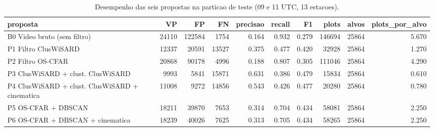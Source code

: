 \begin{table}[!ht]
\centering
\small
\caption{Desempenho das seis propostas na particao de teste (09 e 11 UTC, 13 estacoes).}
\label{tab:comparacao}
\begin{tabular}{lrrrrrrrrr}
\hline
proposta & VP & FP & FN & precisao & recall & F1 & plots & alvos & plots\_por\_alvo \\
\hline
B0  Video bruto (sem filtro) & 24110 & 122584 & 1754 & 0.164 & 0.932 & 0.279 & 146694 & 25864 & 5.670 \\
P1  Filtro ClusWiSARD & 12337 & 20591 & 13527 & 0.375 & 0.477 & 0.420 & 32928 & 25864 & 1.270 \\
P2  Filtro OS-CFAR & 20868 & 90178 & 4996 & 0.188 & 0.807 & 0.305 & 111046 & 25864 & 4.290 \\
P3  ClusWiSARD + clust. ClusWiSARD & 9993 & 5841 & 15871 & 0.631 & 0.386 & 0.479 & 15834 & 25864 & 0.610 \\
P4  ClusWiSARD + clust. ClusWiSARD + cinematica & 11008 & 9272 & 14856 & 0.543 & 0.426 & 0.477 & 20280 & 25864 & 0.780 \\
P5  OS-CFAR + DBSCAN & 18211 & 39870 & 7653 & 0.314 & 0.704 & 0.434 & 58081 & 25864 & 2.250 \\
P6  OS-CFAR + DBSCAN + cinematica & 18239 & 40026 & 7625 & 0.313 & 0.705 & 0.434 & 58265 & 25864 & 2.250 \\
\hline
\end{tabular}
\end{table}

